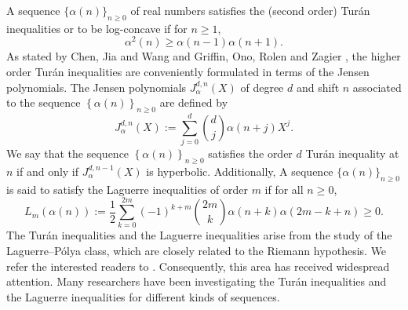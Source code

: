 \documentclass[12pt]{article}
\numberwithin{equation}{section}
\begin{document}
A sequence $\{\alpha(n)\}_{n\geq 0}$ of real numbers satisfies the (second order) Tur\'an inequalities or to be log-concave if for $n\geq 1$,
\[\alpha^2(n)\geq \alpha(n-1)\alpha(n+1).\]
As stated by Chen, Jia and Wang \cite{Chen-Jia-Wang-2019} and Griffin, Ono, Rolen and Zagier \cite{Griffin-Ono-Rolen-Zagier-2019}, the higher order Tur\'an inequalities are conveniently formulated in terms of the Jensen polynomials. The Jensen polynomials $J_\alpha^{d, n}(X)$ of degree $d$ and shift $n$ associated to the sequence $\left\{\alpha(n)\right\}_{n \geq 0}$ are defined by
$$
J_\alpha^{d, n}(X):=\sum_{j=0}^d\binom{d}{j} \alpha(n+j) X^j.
$$
We say that the sequence $\left\{\alpha(n)\right\}_{n \geq 0}$ satisfies the order $d$ Tur\'an inequality at $n$ if and only if $J_\alpha^{d, n-1}(X)$ is hyperbolic.
Additionally, A sequence $\{\alpha(n)\}_{n\geq 0}$ is said to satisfy the Laguerre inequalities of order $m$ if for all $n\geq 0$,
\begin{equation*}
L_m(\alpha(n)):=\frac 12\sum_{k=0}^{2m}(-1)^{k+m} {{2m}\choose k}\alpha(n+k)\alpha(2m-k+n) \geq 0.
\end{equation*}
The Tur\'an inequalities and the Laguerre inequalities arise from the study of the Laguerre--P\'{o}lya class, which are closely related to the Riemann hypothesis. We refer the interested readers to  \cite{Csordas-Varga-1990,Dimitrov-1998,Dimitrov-Lucas-2011,
	Schur-Polya-1914,Szego-1948}. Consequently, this area has received widespread attention. Many researchers have been investigating the Tur\'{a}n inequalities \cite{Chen-Jia-Wang-2019,DeSalvo-Pak-2015,GORT-2019,Griffin-Ono-Rolen-Zagier-2019,
Ono-Pujahari-Rolen,Pandey-2024} and the Laguerre inequalities \cite{Wang-Yang-2022,Wang-Yang-2024,Yang-2024} for different
kinds of sequences.
\end{document}
